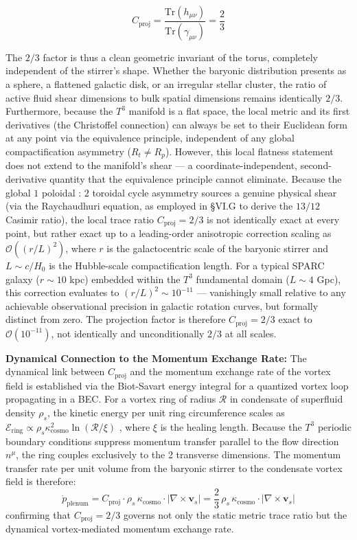 \documentclass[aps,prd,10pt,twocolumn,superscriptaddress,nofootinbib,floatfix]{revtex4-2}
\begin{document}
\begin{equation}
C_{\text{proj}} = \frac{\text{Tr}(h_{\mu\nu})}{\text{Tr}(\gamma_{\mu\nu})} = \frac{2}{3}
\end{equation}

The $2/3$ factor is thus a clean geometric invariant of the torus, completely independent of the stirrer's shape. Whether the baryonic distribution presents as a sphere, a flattened galactic disk, or an irregular stellar cluster, the ratio of active fluid shear dimensions to bulk spatial dimensions remains identically $2/3$. Furthermore, because the $T^3$ manifold is a flat space, the local metric and its first derivatives (the Christoffel connection) can always be set to their Euclidean form at any point via the equivalence principle, independent of any global compactification asymmetry ($R_t \neq R_p$). However, this local flatness statement does not extend to the manifold's shear — a coordinate-independent, second-derivative quantity that the equivalence principle cannot eliminate. Because the global $1$ poloidal : $2$ toroidal cycle asymmetry sources a genuine physical shear (via the Raychaudhuri equation, as employed in \S VI.G to derive the $13/12$ Casimir ratio), the local trace ratio $C_{\text{proj}} = 2/3$ is not identically exact at every point, but rather exact up to a leading-order anisotropic correction scaling as $\mathcal{O}((r/L)^2)$, where $r$ is the galactocentric scale of the baryonic stirrer and $L \sim c/H_0$ is the Hubble-scale compactification length. For a typical SPARC galaxy ($r \sim 10$ kpc) embedded within the $T^3$ fundamental domain ($L \sim 4$ Gpc), this correction evaluates to $(r/L)^2 \sim 10^{-11}$ — vanishingly small relative to any achievable observational precision in galactic rotation curves, but formally distinct from zero. The projection factor is therefore $C_{\text{proj}} = 2/3$ exact to $\mathcal{O}(10^{-11})$, not identically and unconditionally $2/3$ at all scales.

\textbf{Dynamical Connection to the Momentum Exchange Rate:}
The dynamical link between $C_{\text{proj}}$ and the momentum exchange rate of the vortex field is established via the Biot-Savart energy integral for a quantized vortex loop propagating in a BEC. For a vortex ring of radius $\mathcal{R}$ in condensate of superfluid density $\rho_s$, the kinetic energy per unit ring circumference scales as $\mathcal{E}_{\text{ring}} \propto \rho_s \kappa_{\text{cosmo}}^2 \ln(\mathcal{R}/\xi)$ \cite{barcelo}, where $\xi$ is the healing length. Because the $T^3$ periodic boundary conditions suppress momentum transfer parallel to the flow direction $n^\mu$, the ring couples exclusively to the 2 transverse dimensions. The momentum transfer rate per unit volume from the baryonic stirrer to the condensate vortex field is therefore:
\begin{equation}
\dot{p}_{\text{plenum}} = C_{\text{proj}} \cdot \rho_s \, \kappa_{\text{cosmo}} \cdot |\nabla \times \mathbf{v}_s| = \frac{2}{3}\, \rho_s \, \kappa_{\text{cosmo}} \cdot |\nabla \times \mathbf{v}_s|
\end{equation}
confirming that $C_{\text{proj}} = 2/3$ governs not only the static metric trace ratio but the dynamical vortex-mediated momentum exchange rate.
\end{document}
